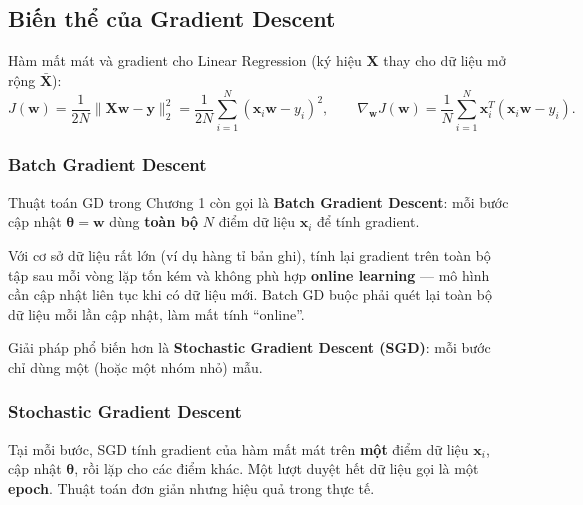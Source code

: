 \subsection{Biến thể của Gradient Descent}
\label{subsec:gd-variants}

\begin{ynghia}[title={Bài toán Linear Regression (nhắc lại)}]
Hàm mất mát và gradient cho Linear Regression (ký hiệu $\mathbf{X}$ thay cho dữ liệu mở rộng $\bar{\mathbf{X}}$):
\[
 J(\mathbf{w}) = \frac{1}{2N}\|\mathbf{X}\mathbf{w} - \mathbf{y}\|_2^2
 = \frac{1}{2N} \sum_{i=1}^N(\mathbf{x}_i \mathbf{w} - y_i)^2,
 \qquad
 \nabla_{\mathbf{w}} J(\mathbf{w}) = \frac{1}{N}\sum_{i=1}^N \mathbf{x}_i^T(\mathbf{x}_i\mathbf{w} - y_i).
\]
\end{ynghia}

\subsubsection{Batch Gradient Descent}

\begin{dinhnghia}[title={Batch Gradient Descent}]
Thuật toán GD trong Chương 1 còn gọi là \textbf{Batch Gradient Descent}: mỗi bước cập nhật $\boldsymbol{\theta} = \mathbf{w}$ dùng \textbf{toàn bộ} $N$ điểm dữ liệu $\mathbf{x}_i$ để tính gradient.
\end{dinhnghia}

\begin{luuy}[title={Hạn chế với dữ liệu lớn và online learning}]
Với cơ sở dữ liệu rất lớn (ví dụ hàng tỉ bản ghi), tính lại gradient trên toàn bộ tập sau mỗi vòng lặp tốn kém và không phù hợp \textbf{online learning} --- mô hình cần cập nhật liên tục khi có dữ liệu mới. Batch GD buộc phải quét lại toàn bộ dữ liệu mỗi lần cập nhật, làm mất tính ``online''.

Giải pháp phổ biến hơn là \textbf{Stochastic Gradient Descent (SGD)}: mỗi bước chỉ dùng một (hoặc một nhóm nhỏ) mẫu.
\end{luuy}

\subsubsection{Stochastic Gradient Descent}

\begin{dinhnghia}[title={Stochastic Gradient Descent (SGD)}]
Tại mỗi bước, SGD tính gradient của hàm mất mát trên \textbf{một} điểm dữ liệu $\mathbf{x}_i$, cập nhật $\boldsymbol{\theta}$, rồi lặp cho các điểm khác. Một lượt duyệt hết dữ liệu gọi là một \textbf{epoch}. Thuật toán đơn giản nhưng hiệu quả trong thực tế.
\end{dinhnghia}

